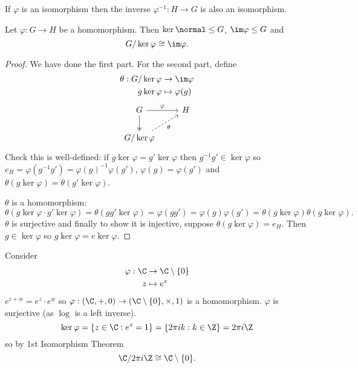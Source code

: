 \documentclass[a4paper]{article}
\theoremstyle{definition}
\begin{document}
\begin{ex}
  If \(\varphi\) is an isomorphism then the inverse \(\varphi^{-1}: H \to G\) is also an isomorphism.
\end{ex}

\begin{theorem}
  Let \(\varphi: G \to H\) be a homomorphism. Then \(\ker \normal \leq G\), \(\im \varphi \leq G\) and
  \[
    G/\ker \varphi \cong \im \varphi.
  \]
\end{theorem}

\begin{proof}
  We have done the first part. For the second part, define
  \begin{align*}
    \theta: G/\ker \varphi &\to \im \varphi \\
    g\ker \varphi &\mapsto \varphi(g)
  \end{align*}
  \[
    \begin{tikzcd}
      G \ar[r, "\varphi"] \ar[d, two heads] & H \\
      G/\ker \varphi \ar[ur, dashed, "\theta"']
    \end{tikzcd}
  \]
  Check this is well-defined: if \(g\ker \varphi = g'\ker \varphi\) then \(g^{-1}g' \in \ker \varphi\) so \(e_H = \varphi(g^{-1}g') = \varphi(g)^{-1}\varphi(g')\), \(\varphi(g) = \varphi(g')\) and \(\theta(g\ker \varphi) = \theta(g'\ker \varphi)\).

  \(\theta\) is a homomorphism:
  \[
    \theta(g\ker \varphi \cdot g'\ker \varphi) = \theta(gg' \ker \varphi) = \varphi(gg') = \varphi(g)\varphi(g') = \theta(g\ker \varphi) \theta(g\ker \varphi).
  \]
  \(\theta\) is surjective and finally to show it is injective, suppose \(\theta(g\ker \varphi) = e_H\). Then \(g \in \ker \varphi\) so \(g\ker \varphi = e\ker \varphi\).
\end{proof}

\begin{eg}
  Consider
  \begin{align*}
    \varphi: \C &\to \C \setminus \{0\} \\
    z &\mapsto e^z
  \end{align*}
  \(e^{z + w} = e^z \cdot e^w\) so \(\varphi: (\C, +, 0) \to (\C \setminus \{0\}, \times, 1)\) is a homomorphism. \(\varphi\) is surjective (as \(\log\) is a left inverse).
  \[
    \ker \varphi = \{z \in \C: e^z = 1\} = \{2\pi ik: k \in \Z\} = 2\pi i\Z
  \]
  so by 1st Isomorphism Theorem
  \[
    \C/2\pi i\Z \cong \C \setminus \{0\}.
  \]
\end{eg}
\end{document}
